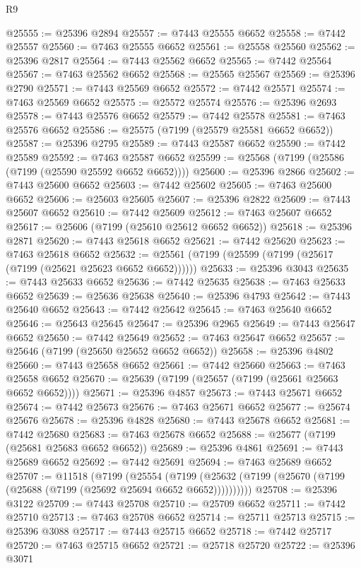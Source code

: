 \begin{lexlean}{R9}
\begin{coremodule}
@25555 := @25396 @2894
@25557 := @7443 @25555 @6652
@25558 := @7442 @25557
@25560 := @7463 @25555 @6652
@25561 := @25558 @25560
@25562 := @25396 @2817
@25564 := @7443 @25562 @6652
@25565 := @7442 @25564
@25567 := @7463 @25562 @6652
@25568 := @25565 @25567
@25569 := @25396 @2790
@25571 := @7443 @25569 @6652
@25572 := @7442 @25571
@25574 := @7463 @25569 @6652
@25575 := @25572 @25574
@25576 := @25396 @2693
@25578 := @7443 @25576 @6652
@25579 := @7442 @25578
@25581 := @7463 @25576 @6652
@25586 := @25575 (@7199 (@25579 @25581 @6652 @6652))
@25587 := @25396 @2795
@25589 := @7443 @25587 @6652
@25590 := @7442 @25589
@25592 := @7463 @25587 @6652
@25599 := @25568 (@7199 (@25586 (@7199 (@25590 @25592 @6652 @6652))))
@25600 := @25396 @2866
@25602 := @7443 @25600 @6652
@25603 := @7442 @25602
@25605 := @7463 @25600 @6652
@25606 := @25603 @25605
@25607 := @25396 @2822
@25609 := @7443 @25607 @6652
@25610 := @7442 @25609
@25612 := @7463 @25607 @6652
@25617 := @25606 (@7199 (@25610 @25612 @6652 @6652))
@25618 := @25396 @2871
@25620 := @7443 @25618 @6652
@25621 := @7442 @25620
@25623 := @7463 @25618 @6652
@25632 := @25561 (@7199 (@25599 (@7199 (@25617 (@7199 (@25621 @25623 @6652 @6652))))))
@25633 := @25396 @3043
@25635 := @7443 @25633 @6652
@25636 := @7442 @25635
@25638 := @7463 @25633 @6652
@25639 := @25636 @25638
@25640 := @25396 @4793
@25642 := @7443 @25640 @6652
@25643 := @7442 @25642
@25645 := @7463 @25640 @6652
@25646 := @25643 @25645
@25647 := @25396 @2965
@25649 := @7443 @25647 @6652
@25650 := @7442 @25649
@25652 := @7463 @25647 @6652
@25657 := @25646 (@7199 (@25650 @25652 @6652 @6652))
@25658 := @25396 @4802
@25660 := @7443 @25658 @6652
@25661 := @7442 @25660
@25663 := @7463 @25658 @6652
@25670 := @25639 (@7199 (@25657 (@7199 (@25661 @25663 @6652 @6652))))
@25671 := @25396 @4857
@25673 := @7443 @25671 @6652
@25674 := @7442 @25673
@25676 := @7463 @25671 @6652
@25677 := @25674 @25676
@25678 := @25396 @4828
@25680 := @7443 @25678 @6652
@25681 := @7442 @25680
@25683 := @7463 @25678 @6652
@25688 := @25677 (@7199 (@25681 @25683 @6652 @6652))
@25689 := @25396 @4861
@25691 := @7443 @25689 @6652
@25692 := @7442 @25691
@25694 := @7463 @25689 @6652
@25707 := @11518
    (@7199
      (@25554
        (@7199 (@25632 (@7199 (@25670 (@7199 (@25688 (@7199 (@25692 @25694 @6652 @6652))))))))))
@25708 := @25396 @3122
@25709 := @7443 @25708
@25710 := @25709 @6652
@25711 := @7442 @25710
@25713 := @7463 @25708 @6652
@25714 := @25711 @25713
@25715 := @25396 @3088
@25717 := @7443 @25715 @6652
@25718 := @7442 @25717
@25720 := @7463 @25715 @6652
@25721 := @25718 @25720
@25722 := @25396 @3071

\end{coremodule}
\end{lexlean}
